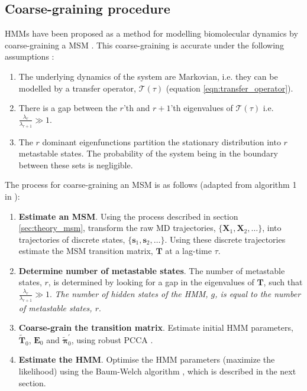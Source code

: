 \subsection{Coarse-graining procedure}\label{sec:theory_coarse_grain}
HMMs have been proposed as a method for modelling biomolecular dynamics by coarse-graining a MSM \cite{noeProjectedHiddenMarkov2013a}. This coarse-graining is accurate under the following assumptions \cite{noeProjectedHiddenMarkov2013a}:
\begin{enumerate}
    \item The underlying dynamics of the system are Markovian, i.e. they can be modelled by a transfer operator, $\mathcal{T}(\tau)$ (equation \ref{eqn:transfer_operator}). 
    \item There is a gap between the $r$'th and $r+1$'th  eigenvalues of $\mathcal{T}(\tau)$ i.e. $\frac{\lambda_{r}}{\lambda_{r+1}} \gg 1$.\label{assump_two}
    \item The $r$ dominant eigenfunctions partition the stationary distribution into $r$ metastable states. The probability of the system being in the boundary between these sets is negligible. \label{assump_three}
\end{enumerate}

The process for coarse-graining an MSM is as follows (adapted from algorithm 1 in \cite{noeProjectedHiddenMarkov2013a}): 
\begin{enumerate}
    \item \textbf{Estimate an MSM}. Using the process described in section \ref{sec:theory_msm}, transform the raw MD trajectories, $\{\mathbf{X}_{1}, \mathbf{X}_{2}, \ldots\}$, into trajectories of discrete states, $\{\mathbf{s}_{1},\mathbf{s}_{2}, \ldots\}$. Using these discrete trajectories estimate the MSM transition matrix, $\mathbf{T}$ at a lag-time $\tau$. 
    \item \textbf{Determine number of metastable states}. The number of metastable states, $r$, is determined by looking for a gap in the eigenvalues of $\mathbf{T}$, such that  $\frac{\lambda_{r}}{\lambda_{r+1}} \gg 1$. \emph{The number of hidden states of the HMM, $g$, is equal to the number of metastable states, $r$}.\label{item:theory_nmetastable}
    \item \textbf{Coarse-grain the transition matrix}. Estimate initial HMM parameters, $\widetilde{\mathbf{T}}_{0}$,  $\mathbf{E}_{0}$ and $\widetilde{\bm{\pi}}^{\prime}_{0}$, using robust PCCA \cite{deuflhardRobustPerronCluster2005b}. 
    \item \textbf{Estimate the HMM}. Optimise the HMM parameters (maximize the likelihood) using the Baum-Welch algorithm \cite{baumMaximizationTechniqueOccurring1970,welch2003hidden}, which is described in the next section. 
\end{enumerate}

